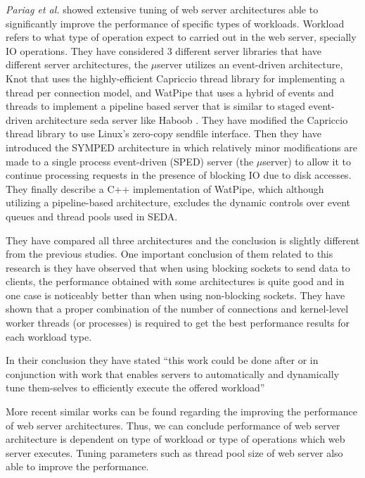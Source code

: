 \textit{Pariag et al.} \cite{comp_ac}  showed extensive tuning of web server architectures able to significantly improve the performance of specific types of workloads. Workload refers to what type of operation expect to carried out in the web server, specially IO operations. They have considered 3 different server libraries that have different server architectures, the $\mu$server utilizes an event-driven architecture, Knot that uses the highly-efficient Capriccio thread library for  implementing a thread per connection model, and WatPipe that uses a hybrid of events and threads to implement a pipeline based server that is similar to staged event-driven architecture \acrfull{seda} server like Haboob \cite{seda}. They have  modified the Capriccio thread library to use Linux's zero-copy sendfile interface. Then they have introduced the \acrfull{SYMPED} architecture in which relatively minor modifications are made to a single process event-driven (SPED) \cite{flash_server} server (the $\mu$server) to allow it to continue processing requests in the presence of blocking IO due to disk accesses. They finally describe a C++ implementation of WatPipe, which although utilizing a pipeline-based architecture, excludes the dynamic controls over event queues and thread pools used in SEDA. 

They have compared all three architectures and the conclusion is slightly different from the previous studies. One important conclusion of them related to this research is they have observed that when using blocking sockets to send data to clients, the performance obtained with some architectures is quite good and in one case is noticeably better than when using non-blocking sockets. They have shown that a proper combination of the number of connections and kernel-level worker threads (or processes) is required to get the best performance results for each workload type.

In their conclusion they have stated  “this work could be done after or in conjunction with work that enables servers to automatically and dynamically tune them-selves to efficiently execute the offered workload”

More recent similar works \cite{comparing_high_performance_multi_core,uniproc_multiproc} can be found regarding the improving the performance of web server architectures. Thus, we can conclude performance of web server architecture is dependent on type of workload or type of operations which web server executes. Tuning parameters such as thread pool size of web server also able to improve the performance.

